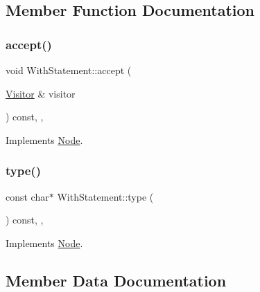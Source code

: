 \subsection{Member Function Documentation}
\mbox{\label{struct_with_statement_a07d3015de8ea5d3f27a0bab8719665f3}} 
\subsubsection{\texorpdfstring{accept()}{accept()}}
{\footnotesize\ttfamily void With\+Statement\+::accept (\begin{DoxyParamCaption}\item[{\hyperlink{struct_visitor}{Visitor} \&}]{visitor }\end{DoxyParamCaption}) const\hspace{0.3cm}{\ttfamily [inline]}, {\ttfamily [override]}, {\ttfamily [virtual]}}



Implements \hyperlink{struct_node_a10bd7af968140bbf5fa461298a969c71}{Node}.

\mbox{\label{struct_with_statement_ae26ccb907f2cbc302011c77c7b356ad1}} 
\subsubsection{\texorpdfstring{type()}{type()}}
{\footnotesize\ttfamily const char$\ast$ With\+Statement\+::type (\begin{DoxyParamCaption}{ }\end{DoxyParamCaption}) const\hspace{0.3cm}{\ttfamily [inline]}, {\ttfamily [override]}, {\ttfamily [virtual]}}



Implements \hyperlink{struct_node_a82f29420d0a38efcc370352528e94e9b}{Node}.



\subsection{Member Data Documentation}
\mbox{\label{struct_with_statement_af7976ff82c99c995f603c2d32e8122ff}} 
